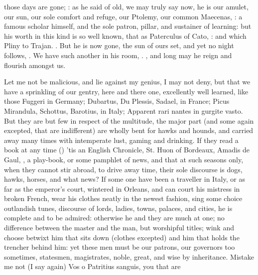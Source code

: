 {those days are gone; : as he said of old, we may truly say now, he is
our amulet, our sun, our sole comfort and refuge, our Ptolemy, our common
Maecenas, : a famous scholar himself,
and the sole patron, pillar, and sustainer of learning: but his worth
in this kind is so well known, that as Paterculus of Cato, : and which Pliny to Trajan. . But he is now gone, the sun of ours set, and yet no night
follows, . We have such another in
his room, . ,
and long may he reign and flourish amongst us.

Let me not be malicious, and lie against my genius, I may not deny, but
that we have a sprinkling of our gentry, here and there one,
excellently well learned, like those Fuggeri in Germany; Dubartus, Du
Plessis, Sadael, in France; Picus Mirandula, Schottus, Barotius, in
Italy; Apparent rari nantes in gurgite vasto. But they are but few in
respect of the multitude, the major part (and some again excepted, that
are indifferent) are wholly bent for hawks and hounds, and carried away
many times with intemperate lust, gaming and drinking. If they read a
book at any time () 'tis an English Chronicle, St. Huon of Bordeaux, Amadis de
Gaul, \etc{}, a play-book, or some pamphlet of news, and that at such
seasons only, when they cannot stir abroad, to drive away time,
their sole discourse is dogs, hawks, horses, and what news? If
some one have been a traveller in Italy, or as far as the emperor's
court, wintered in Orleans, and can court his mistress in broken
French, wear his clothes neatly in the newest fashion, sing some choice
outlandish tunes, discourse of lords, ladies, towns, palaces, and
cities, he is complete and to be admired: otherwise he and they
are much at one; no difference between the master and the man, but
worshipful titles; wink and choose betwixt him that sits down (clothes
excepted) and him that holds the trencher behind him: yet these men
must be our patrons, our governors too sometimes, statesmen,
magistrates, noble, great, and wise by inheritance.
Mistake me not (I say again) Vos o Patritius sanguis, you that are

}
